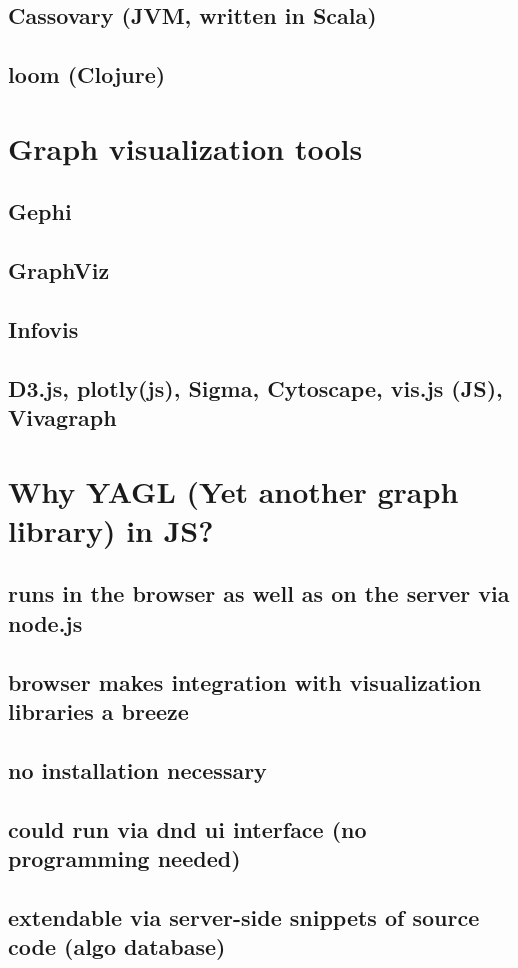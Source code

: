 	\subsection{Cassovary (JVM, written in Scala)}
	\label{ssect:cassovary}
	
	\subsection{loom (Clojure)}
	\label{ssect:loom}
	


\section{Graph visualization tools}
\label{sect:graph_visualization}

	\subsection{Gephi}
	\label{ssect:gephi}
	
	\subsection{GraphViz}
	\label{ssect:graphviz}
	
	\subsection{Infovis}
	\label{ssect:infovis}
	
	\subsection{D3.js, plotly(js), Sigma, Cytoscape, vis.js (JS), Vivagraph}
	\label{ssect:js_based_vis}



\section{Why YAGL (Yet another graph library) in JS?}
\label{sect:why_yagl}

	\subsection{runs in the browser as well as on the server via node.js}
	\label{ssect:browser}
	
	\subsection{browser makes integration with visualization libraries a breeze}
	\label{ssect:vis_integrate}
	
	\subsection{no installation necessary}
	\label{ssect:no_inst}
	
	\subsection{could run via dnd ui interface (no programming needed)}
	\label{ssect:no_prog}
	
	\subsection{extendable via server-side snippets of source code (algo database)}
	\label{ssect:extendable}

